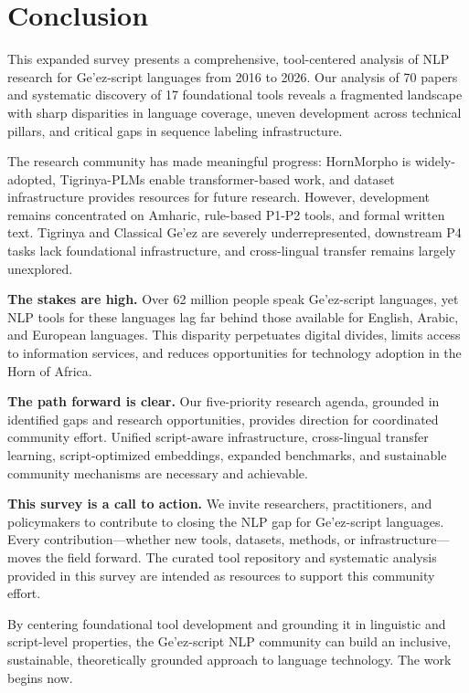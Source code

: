 \documentclass[12pt,a4paper]{article}
\theoremstyle{plain}
\theoremstyle{definition}
\begin{document}
\section{Conclusion}
\label{sec:conclusion}

This expanded survey presents a comprehensive, tool-centered analysis of NLP research for Ge'ez-script languages from 2016 to 2026. Our analysis of 70 papers and systematic discovery of 17 foundational tools reveals a fragmented landscape with sharp disparities in language coverage, uneven development across technical pillars, and critical gaps in sequence labeling infrastructure.

The research community has made meaningful progress: HornMorpho is widely-adopted, Tigrinya-PLMs enable transformer-based work, and dataset infrastructure provides resources for future research. However, development remains concentrated on Amharic, rule-based P1-P2 tools, and formal written text. Tigrinya and Classical Ge'ez are severely underrepresented, downstream P4 tasks lack foundational infrastructure, and cross-lingual transfer remains largely unexplored.

\textbf{The stakes are high.} Over 62 million people speak Ge'ez-script languages, yet NLP tools for these languages lag far behind those available for English, Arabic, and European languages. This disparity perpetuates digital divides, limits access to information services, and reduces opportunities for technology adoption in the Horn of Africa.

\textbf{The path forward is clear.} Our five-priority research agenda, grounded in identified gaps and research opportunities, provides direction for coordinated community effort. Unified script-aware infrastructure, cross-lingual transfer learning, script-optimized embeddings, expanded benchmarks, and sustainable community mechanisms are necessary and achievable.

\textbf{This survey is a call to action.} We invite researchers, practitioners, and policymakers to contribute to closing the NLP gap for Ge'ez-script languages. Every contribution---whether new tools, datasets, methods, or infrastructure---moves the field forward. The curated tool repository and systematic analysis provided in this survey are intended as resources to support this community effort.

By centering foundational tool development and grounding it in linguistic and script-level properties, the Ge'ez-script NLP community can build an inclusive, sustainable, theoretically grounded approach to language technology. The work begins now.
\end{document}
